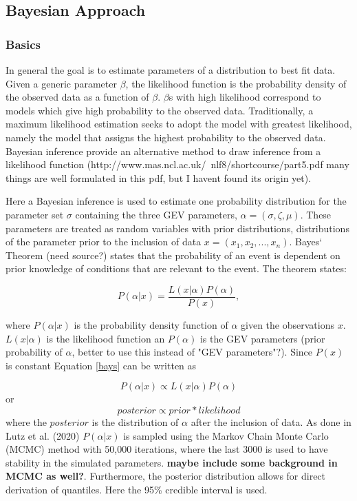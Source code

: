 \subsection{Bayesian Approach}
\subsubsection{Basics}
In general the goal is to estimate parameters of a distribution to best fit data. Given a generic parameter $\beta$, the likelihood function is the probability density of the observed data as a function of $\beta$. $\beta$s with high likelihood correspond to models which give high probability to the observed data. Traditionally, a maximum likelihood estimation seeks to adopt the model with greatest likelihood, namely the model that assigns the highest probability to the observed data. Bayesian inference provide an alternative method to draw inference from a likelihood function (http://www.mas.ncl.ac.uk/~nlf8/shortcourse/part5.pdf many things are well formulated in this pdf, but I havent found its origin yet). 

Here a Bayesian inference is used to estimate one probability distribution for the parameter set $\sigma$ containing the three GEV parameters, $\alpha = (\sigma, \zeta, \mu)$. These parameters are treated as random variables with prior distributions, distributions of the parameter prior to the inclusion of data $x = (x_1, x_2,...,x_n)$. Bayes` Theorem (need source?) states that the probability of an event is dependent on prior knowledge of conditions that are relevant to the event. The theorem states:

\begin{equation}
P(\alpha \vert x) = \frac{L(x \vert \alpha)P(\alpha)}{P(x)},
\label{bays}
\end{equation}

where $P(\alpha \vert x)$ is the probability density function of $\alpha$ given the observations $x$. $L(x \vert \alpha)$ is the likelihood function an $P(\alpha)$ is the GEV parameters (prior probability of $\alpha$, better to use this instead of "GEV parameters"?). Since $P(x)$ is constant Equation \eqref{bays} can be written as 

\begin{equation}
P(\alpha \vert x)\propto L(x \vert \alpha)P(\alpha)
\end{equation}  
or
\begin{equation}
posterior \propto prior * likelihood
\end{equation}
where the $posterior$ is the distribution of $\alpha$ after the inclusion of data. As done in Lutz et al. (2020) $P(\alpha \vert x)$ is sampled using the Markov Chain Monte Carlo (MCMC) method with 50,000 iterations, where the last 3000 is used to have stability in the simulated parameters. \textbf{maybe include some background in MCMC as well?}. Furthermore, the posterior distribution allows for direct derivation of quantiles. Here the 95\% credible interval is used. 


